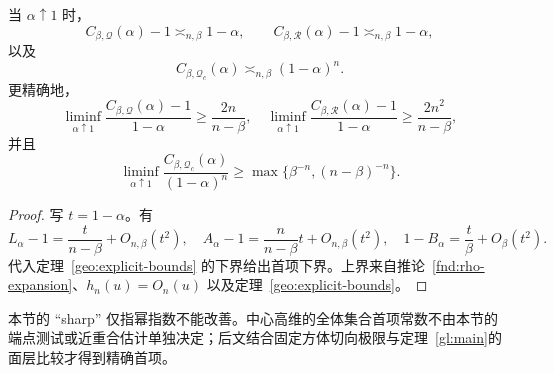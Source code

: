 \begin{corollary}[端点幂指数与可验证的首项下界]
\label{geo:endpoint-orders}
当 $\alpha\uparrow1$ 时，
\[
 C_{\beta,\mathcal Q}(\alpha)-1\asymp_{n,\beta}1-\alpha,
 \qquad C_{\beta,\mathcal R}(\alpha)-1\asymp_{n,\beta}1-\alpha,
\]
以及
\[
 C_{\beta,\mathcal Q_c}(\alpha)\asymp_{n,\beta}(1-\alpha)^n.
\]
更精确地，
\[
 \liminf_{\alpha\uparrow1}
 \frac{C_{\beta,\mathcal Q}(\alpha)-1}{1-\alpha}\geq\frac{2n}{n-\beta},
 \quad
 \liminf_{\alpha\uparrow1}
 \frac{C_{\beta,\mathcal R}(\alpha)-1}{1-\alpha}\geq\frac{2n^2}{n-\beta},
\]
并且
\[
 \liminf_{\alpha\uparrow1}
 \frac{C_{\beta,\mathcal Q_c}(\alpha)}{(1-\alpha)^n}
 \geq\max\{\beta^{-n},(n-\beta)^{-n}\}.
\]
\end{corollary}

\begin{proof}
写 $t=1-\alpha$。有
\[
 L_\alpha-1=\frac{t}{n-\beta}+O_{n,\beta}(t^2),\quad
 A_\alpha-1=\frac{n}{n-\beta}t+O_{n,\beta}(t^2),\quad
 1-B_\alpha=\frac{t}{\beta}+O_\beta(t^2).
\]
代入定理~\ref{geo:explicit-bounds} 的下界给出首项下界。上界来自推论~\ref{fnd:rho-expansion}、$h_n(u)=O_n(u)$ 以及定理~\ref{geo:explicit-bounds}。
\end{proof}

\begin{remark}
\label{geo:scope}
本节的 ``sharp'' 仅指幂指数不能改善。中心高维的全体集合首项常数不由本节的端点测试或近重合估计单独决定；后文结合固定方体切向极限与定理~\ref{gl:main}的面层比较才得到精确首项。
\end{remark}

